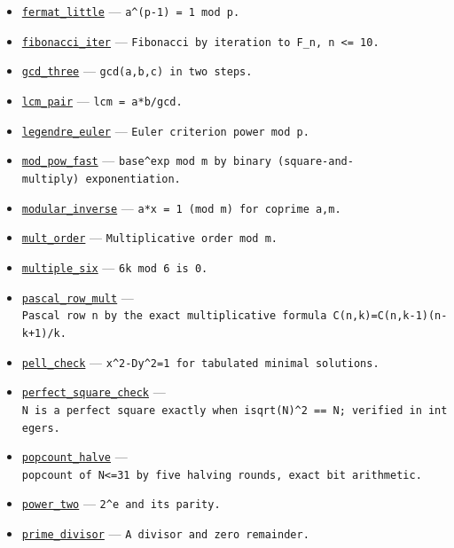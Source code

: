 \documentclass[
  10pt,
]{article}
\begin{document}
\begin{itemize}
\item
  \href{../generation_1/I1/algos_gen1_big.py}{\texttt{fermat\_little}}
  --- \texttt{a\^{}(p-1)\ =\ 1\ mod\ p.}
\item
  \href{../generation_1/I1/algos_gen1_ext.py}{\texttt{fibonacci\_iter}}
  --- \texttt{Fibonacci\ by\ iteration\ to\ F\_n,\ n\ \textless{}=\ 10.}
\item
  \href{../generation_1/I1/algos_gen1_big.py}{\texttt{gcd\_three}} ---
  \texttt{gcd(a,b,c)\ in\ two\ steps.}
\item
  \href{../generation_1/I1/algos_gen1_big.py}{\texttt{lcm\_pair}} ---
  \texttt{lcm\ =\ a*b/gcd.}
\item
  \href{../generation_1/I1/algos_gen1_big.py}{\texttt{legendre\_euler}}
  --- \texttt{Euler\ criterion\ power\ mod\ p.}
\item
  \href{../tools/prm/algos.py}{\texttt{mod\_pow\_fast}} ---
  \texttt{base\^{}exp\ mod\ m\ by\ binary\ (square-and-multiply)\ exponentiation.}
\item
  \href{../generation_1/I1/algos_gen1_ext.py}{\texttt{modular\_inverse}}
  --- \texttt{a*x\ =\ 1\ (mod\ m)\ for\ coprime\ a,m.}
\item
  \href{../generation_1/I1/algos_gen1_big.py}{\texttt{mult\_order}} ---
  \texttt{Multiplicative\ order\ mod\ m.}
\item
  \href{../generation_1/I1/algos_gen1_big.py}{\texttt{multiple\_six}}
  --- \texttt{6k\ mod\ 6\ is\ 0.}
\item
  \href{../generation_1/I3/algos_i3.py}{\texttt{pascal\_row\_mult}} ---
  \texttt{Pascal\ row\ n\ by\ the\ exact\ multiplicative\ formula\ C(n,k)=C(n,k-1)(n-k+1)/k.}
\item
  \href{../generation_1/I1/algos_gen1_big.py}{\texttt{pell\_check}} ---
  \texttt{x\^{}2-Dy\^{}2=1\ for\ tabulated\ minimal\ solutions.}
\item
  \href{../generation_1/I3/algos_i3.py}{\texttt{perfect\_square\_check}}
  ---
  \texttt{N\ is\ a\ perfect\ square\ exactly\ when\ isqrt(N)\^{}2\ ==\ N;\ verified\ in\ integers.}
\item
  \href{../generation_1/I3/algos_i3.py}{\texttt{popcount\_halve}} ---
  \texttt{popcount\ of\ N\textless{}=31\ by\ five\ halving\ rounds,\ exact\ bit\ arithmetic.}
\item
  \href{../generation_1/I1/algos_gen1_big.py}{\texttt{power\_two}} ---
  \texttt{2\^{}e\ and\ its\ parity.}
\item
  \href{../generation_1/I1/algos_gen1_big.py}{\texttt{prime\_divisor}}
  --- \texttt{A\ divisor\ and\ zero\ remainder.}

\end{itemize}
\end{document}

